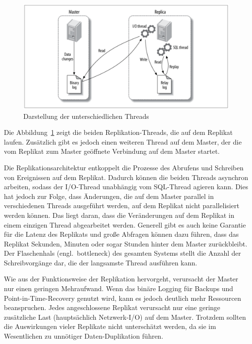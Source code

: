 \vspace{-5pt}
\begin{figure}[H]
  \centering
  \includegraphics[width=.8\textwidth]{PNGs/Textbook/Master_Replica}
  \caption[Master-Replikat-Visualisierung]{Darstellung der unterschiedlichen Threads}
  \label{fig:master-replica}
\end{figure}
\vspace{-18pt}

Die Abbildung~\ref{fig:master-replica} zeigt die beiden Replikation-Threads, die auf dem Replikat laufen.
Zusätzlich gibt es jedoch einen weiteren Thread auf dem Master, der die vom Replikat zum Master geöffnete Verbindung auf dem Master startet.

Die Replikationsarchitektur entkoppelt die Prozesse des Abrufens und Schreiben von Ereignissen auf dem Replikat.
Dadurch können die beiden Threads asynchron arbeiten, sodass der I/O-Thread unabhängig vom SQL-Thread agieren kann.
Dies hat jedoch zur Folge, dass Änderungen, die auf dem Master parallel in verschiedenen Threads ausgeführt werden, auf dem Replikat nicht parallelisiert werden können.
Das liegt daran, dass die Veränderungen auf dem Replikat in einem einzigen Thread abgearbeitet werden.
Generell gibt es auch keine Garantie für die Latenz des Replikats und große Abfragen können dazu führen, dass das Replikat Sekunden, Minuten oder sogar Stunden hinter dem Master zurückbleibt.
Der Flaschenhals (engl.\ bottleneck) des gesamten Systems stellt die Anzahl der Schreibvorgänge dar, die der langsamste Thread ausführen kann.

Wie aus der Funktionsweise der Replikation hervorgeht, verursacht der Master nur einen geringen Mehraufwand.
Wenn das binäre Logging für Backups und Point-in-Time-Recovery genutzt wird, kann es jedoch deutlich mehr Ressourcen beanspruchen.
Jedes angeschlossene Replikat verursacht nur eine geringe zusätzliche Last (hauptsächlich Netzwerk-I/O) auf dem Master.
Trotzdem sollten die Auswirkungen vieler Replikate nicht unterschätzt werden, da sie im Wesentlichen zu unnötiger Daten-Duplikation führen.

